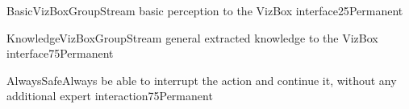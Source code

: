 
\begin{Group}{BasicVizBoxGroup}{Stream basic perception to the VizBox interface}{25}{Permanent}
\end{Group}


\begin{Group}{KnowledgeVizBoxGroup}{Stream general extracted knowledge to the VizBox interface}{75}{Permanent}
\end{Group}


\begin{Group}{AlwaysSafe}{Always be able to interrupt the action and continue it, without any additional expert interaction}{75}{Permanent}
\end{Group}